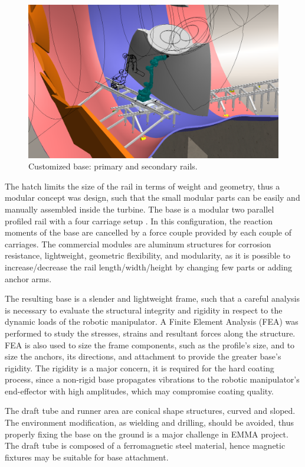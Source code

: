 \begin{figure}
	\centering
	\includegraphics[width=.8\columnwidth]{figs/mecanica/EMMA_Base_Secundaria_01.PNG}
    \caption{Customized base: primary and secondary rails.}
    \label{fig:base}
\end{figure}

The hatch limits the size of the rail in terms of weight and geometry, thus a
modular concept was design, such that the small modular parts can be easily and
manually assembled inside the turbine. The base is a modular two parallel
profiled rail with a four carriage setup  \cite{SKF_2013}. In this
configuration, the reaction moments of the base are cancelled by a force couple provided by each couple of
carriages. The commercial modules are aluminum structures for corrosion resistance,
lightweight, geometric flexibility, and modularity, as it is possible to
increase/decrease the rail length/width/height by changing few parts or adding
anchor arms.

The resulting base is a slender and lightweight frame, such that a careful
analysis is necessary to evaluate the structural integrity and rigidity in
respect to the dynamic loads of the robotic manipulator. A Finite Element
Analysis (FEA) was performed to study the stresses, strains and resultant forces
along the structure. FEA is also used to size the frame components, such as
the profile's size, and to size the anchors, its directions, and attachment to
provide the greater base's rigidity. The rigidity is a major concern, it is
required for the hard coating process, since a non-rigid base propagates
vibrations to the robotic manipulator's end-effector with high amplitudes, which
may compromise coating quality.

The draft tube and runner area are conical shape structures, curved and
sloped. The environment modification, as wielding and drilling, should be
avoided, thus properly fixing the base on the ground is a major challenge in
EMMA project. The draft tube is composed of a ferromagnetic steel material,
hence magnetic fixtures may be suitable for base attachment. 

